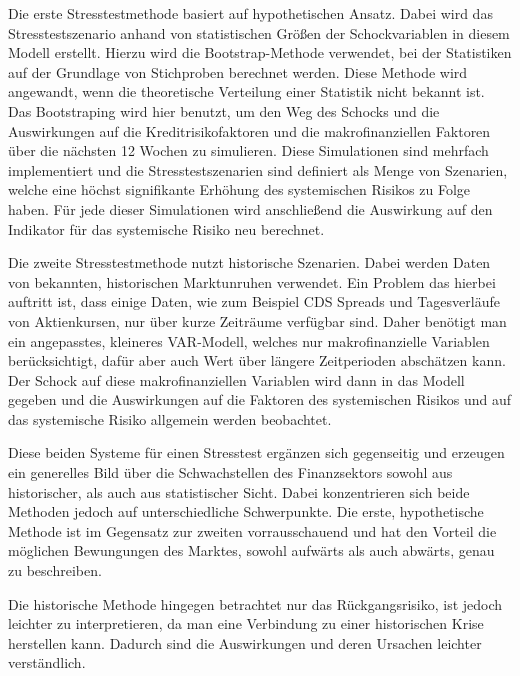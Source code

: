 \documentclass[a4paper,12pt]{scrartcl}
\begin{document}
Die erste Stresstestmethode basiert auf hypothetischen Ansatz. Dabei wird das Stresstestszenario anhand von statistischen Größen der Schockvariablen in diesem Modell erstellt. Hierzu wird die Bootstrap-Methode verwendet, bei der Statistiken auf der Grundlage von Stichproben berechnet werden. Diese Methode wird angewandt, wenn die theoretische Verteilung einer Statistik nicht bekannt ist.
Das Bootstraping wird hier benutzt, um den Weg des Schocks und die Auswirkungen auf die Kreditrisikofaktoren und die makrofinanziellen Faktoren  über die nächsten 12 Wochen zu simulieren. 
Diese Simulationen sind mehrfach implementiert und die Stresstestszenarien sind definiert als Menge von Szenarien, welche eine höchst signifikante Erhöhung des systemischen Risikos zu Folge haben.
Für jede dieser Simulationen wird anschließend die Auswirkung auf den Indikator für das systemische Risiko neu berechnet. 

Die zweite Stresstestmethode nutzt historische Szenarien. Dabei werden Daten von bekannten, historischen Marktunruhen verwendet. Ein Problem das hierbei auftritt ist, dass einige Daten, wie zum Beispiel CDS Spreads und Tagesverläufe von Aktienkursen, nur über kurze Zeiträume verfügbar sind. Daher benötigt man ein angepasstes, kleineres VAR-Modell, welches nur makrofinanzielle Variablen berücksichtigt, dafür aber auch Wert über längere Zeitperioden abschätzen kann.
Der Schock auf diese makrofinanziellen Variablen wird dann in das Modell gegeben und die Auswirkungen auf die Faktoren des systemischen Risikos und auf das systemische Risiko allgemein werden beobachtet.

Diese beiden Systeme für einen Stresstest ergänzen sich gegenseitig und erzeugen ein generelles Bild über die Schwachstellen des Finanzsektors sowohl aus historischer, als auch aus statistischer Sicht. Dabei konzentrieren sich beide Methoden jedoch auf unterschiedliche Schwerpunkte.
Die erste, hypothetische Methode ist im Gegensatz zur zweiten vorrausschauend und hat den Vorteil die möglichen Bewungungen des Marktes, sowohl aufwärts als auch abwärts, genau zu beschreiben. 

Die historische Methode hingegen betrachtet nur das Rückgangsrisiko, ist jedoch leichter zu interpretieren, da man eine Verbindung zu einer historischen Krise herstellen kann. Dadurch sind die Auswirkungen und deren Ursachen leichter verständlich.
\newpage
\end{document}
